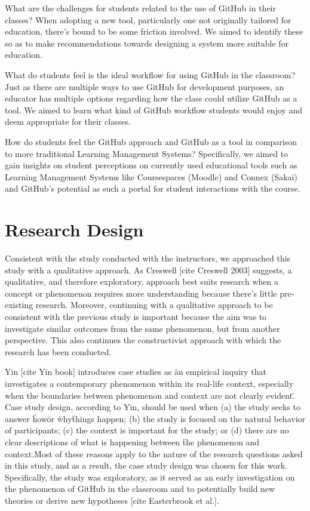 \bigskip
What are the challenges for students related to the use of GitHub in their classes? When adopting a new tool, particularly one not originally tailored for education, there's bound to be some friction involved. We aimed to identify these so as to make recommendations towards designing a system more suitable for education.

\bigskip
What do students feel is the ideal workflow for using GitHub in the classroom? Just as there are multiple ways to use GitHub for development purposes, an educator has multiple options regarding how the class could utilize GitHub as a tool. We aimed to learn what kind of GitHub workflow students would enjoy and deem appropriate for their classes.

\bigskip
How do students feel the GitHub approach and GitHub as a tool in comparison to more traditional Learning Management Systems? Specifically, we aimed to gain insights on student perceptions on currently used educational tools such as Learning Management Systems like Coursespaces (Moodle) and Connex (Sakai) and GitHub's potential as such a portal for student interactions with the course.

\section{Research Design}
Consistent with the study conducted with the instructors, we approached this study with a qualitative approach. As Creswell [cite Creswell 2003] suggests, a qualitative, and therefore exploratory, approach best suits research when a concept or phenomenon requires more understanding because there's little pre-existing research. Moreover, continuing with a qualitative approach to be consistent with the previous study is important because the aim was to investigate similar outcomes from the same phenomenon, but from another perspective. This also continues the constructivist approach with which the research has been conducted.

Yin [cite Yin book] introduces case studies as \"an empirical inquiry that investigates a contemporary phenomenon within its real-life context, especially when the boundaries between phenomenon and context are not clearly evident\". Case study design, according to Yin, should be used when (a) the study seeks to answer \"how\" or \"why\" things happen; (b) the study is focused on the natural behavior of participants; (c) the context is important for the study; or (d) there are no clear descriptions of what is happening between \"the phenomenon and context.\" Most of these reasons apply to the nature of the research questions asked in this study, and as a result, the case study design was chosen for this work. Specifically, the study was exploratory, as it served as an early investigation on the phenomenon of GitHub in the classroom and to potentially build new theories or derive new hypotheses [cite Easterbrook et al.].

